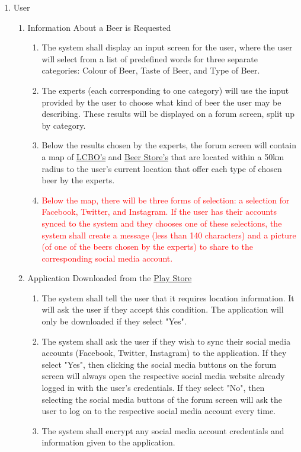 \documentclass[]{article}
\begin{document}
\begin{enumerate}[{VP}1.]
	\item User
	
	\begin{enumerate}[{BE1}.1]
		\item Information About a Beer is Requested
		\begin{enumerate}
			\item The system shall display an input screen for the user, where the user will select from a list of predefined words for three separate categories: Colour of Beer, Taste of Beer, and Type of Beer.
			\item The experts (each corresponding to one category) will use the input provided by the user to choose what kind of beer the user may be describing. These results will be displayed on a forum screen, split up by category.
			\item Below the results chosen by the experts, the forum screen will contain a map of \underline{LCBO's} and \underline{Beer Store's} that are located within a 50km radius to the user's current location that offer each type of chosen beer by the experts.
			\item \textcolor{red}{Below the map, there will be three forms of selection: a selection for Facebook, Twitter, and Instagram. If the user has their accounts synced to the system and they chooses one of these selections, the system shall create a message (less than 140 characters) and a picture (of one of the beers chosen by the experts) to share to the corresponding social media account.}
		\end{enumerate}
		
		\item Application Downloaded from the \underline{Play Store}
		\begin{enumerate}
			\item The system shall tell the user that it requires location information. It will ask the user if they accept this condition. The application will only be downloaded if they select "Yes".
			\item The system shall ask the user if they wish to sync their social media accounts (Facebook, Twitter, Instagram) to the application. If they select "Yes", then clicking the social media buttons on the forum screen will always open the respective social media website already logged in with the user's credentials. If they select "No", then selecting the social media buttons of the forum screen will ask the user to log on to the respective social media account every time.
			\item The system shall encrypt any social media account credentials and information given to the application. 
		\end{enumerate}
		

\end{enumerate}
\end{enumerate}
\end{document}

